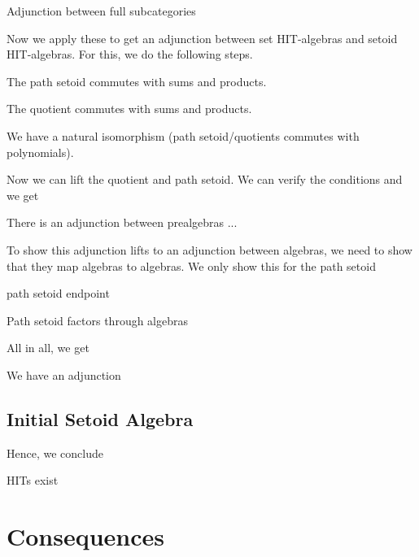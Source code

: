 \documentclass[9pt]{entcs}
\newcommand{\0}{\textbf{0}} %
\newcommand{\1}{\textbf{1}} %
\begin{document}
\begin{lemma}
Adjunction between full subcategories
\end{lemma}

Now we apply these to get an adjunction between set HIT-algebras and setoid HIT-algebras.
For this, we do the following steps.

\begin{lemma}
The path setoid commutes with sums and products.

The quotient commutes with sums and products.
\end{lemma}

\begin{lemma}
We have a natural isomorphism (path setoid/quotients commutes with polynomials).
\end{lemma}

Now we can lift the quotient and path setoid.
We can verify the conditions and we get

\begin{lemma}
There is an adjunction between prealgebras ...
\end{lemma}

To show this adjunction lifts to an adjunction between algebras, we need to show that they map algebras to algebras.
We only show this for the path setoid

\begin{lemma}
path setoid endpoint
\end{lemma}

\begin{lemma}
Path setoid factors through algebras
\end{lemma}

All in all, we get

\begin{proposition}
We have an adjunction
\end{proposition}

\subsection{Initial Setoid Algebra}

Hence, we conclude

\begin{theorem}
HITs exist
\end{theorem}

\section{Consequences}
\end{document}
